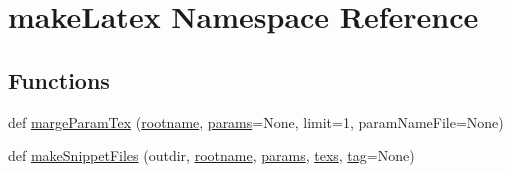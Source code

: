 \hypertarget{namespacemakeLatex}{}\section{make\+Latex Namespace Reference}
\label{namespacemakeLatex}
\subsection*{Functions}
\begin{DoxyCompactItemize}
\item 
def \mbox{\hyperlink{namespacemakeLatex_a44141ca7b3dfd236279c2c784ed21b3f}{marge\+Param\+Tex}} (\mbox{\hyperlink{namespacemakeLatex_a70da0cc442552b58d69b71d317ee6c48}{rootname}}, \mbox{\hyperlink{namespacemakeLatex_a7def07e6bedf3e40f865067a2c8baa69}{params}}=None, limit=1, param\+Name\+File=None)
\item 
def \mbox{\hyperlink{namespacemakeLatex_aaf761aac14c432e9140137d2658a53cf}{make\+Snippet\+Files}} (outdir, \mbox{\hyperlink{namespacemakeLatex_a70da0cc442552b58d69b71d317ee6c48}{rootname}}, \mbox{\hyperlink{namespacemakeLatex_a7def07e6bedf3e40f865067a2c8baa69}{params}}, \mbox{\hyperlink{namespacemakeLatex_aa1b11d17d766fdf9e5c87e13fab6dd2f}{texs}}, \mbox{\hyperlink{namespacemakeLatex_ae0994c8e085952238b42e4dc4d2cdf57}{tag}}=None)
\end{DoxyCompactItemize}
